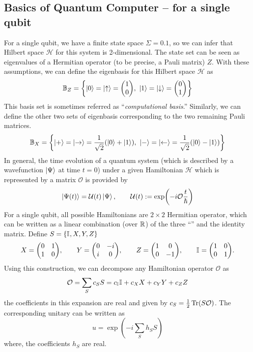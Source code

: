 \documentclass[11pt, oneside, listof=totoc]{scrbook}
\renewcommand{\H}{\mathcal{H}}
\renewcommand{\O}{\mathcal{O}}
\newcommand{\ku}{\ket{0}}
\newcommand{\kd}{\ket{1}}
\newcommand{\kr}{\ket{+}}
\newcommand{\kl}{\ket{-}}
\newcommand{\UU}{\mathcal{U}}
\begin{document}
\subsection{Basics of Quantum Computer -- for a single qubit}\label{ssec:quantum-computer}
For a single qubit, we have a finite state space \(\Sigma = \qty{0, 1}\), so we can infer that Hilbert space \(\H\) for this system is 2-dimensional. The state set can be seen as eigenvalues of a Hermitian operator (to be precise, a Pauli matrix) \(Z\). With these assumptions, we can define the eigenbasis for this Hilbert space \(\H\) as
\begin{equation}
    \B_Z = \qty{\ku = \ket{\uparrow} = \mqty(1 \\ 0),~ \kd= \ket{\downarrow} = \mqty(0 \\ 1)}
\end{equation}
This basis set is sometimes referred as ``\emph{computational basis}.'' Similarly, we can define the other two sets of eigenbasis corresponding to the two remaining Pauli matrices.
\begin{equation}
    \B_X = \qty{\kr = \ket{\rightarrow} = \frac{1}{\sqrt{2}} \qty(\ku + \kd),~ \kl = \ket{\leftarrow} = \frac{1}{\sqrt{2}} \qty(\ku - \kd)}
\end{equation}
In general, the time evolution of a quantum system (which is described by a wavefunction \(\ket{\Psi}\) at time \(t = 0\)) under a given Hamiltonian \(\mathscr{H}\) which is represented by a matrix \(\O\) is provided by
\[
    \ket{\Psi (t)} = \UU(t) \ket{\Psi}, \qquad \UU(t) := \exp(- i \O \frac{t}{\hslash})
\]
For a single qubit, all possible Hamiltonians are \(2 \times 2\) Hermitian operator, which can be written as a linear combination (over \(\mathbb R\)) of the three ``'' and the identity matrix. Define \(S = \qty{\mathbb{I}_{}, X, Y, Z}\)
\begin{equation}
    X = \mqty(0 & 1 \\ 1 & 0), \qquad Y = \mqty(0 & -i \\ i & 0), \qquad Z = \mqty(1 & 0 \\ 0 & -1), \qquad \I{} = \mqty(1 & 0 \\ 0 & 1).
\end{equation}
Using this construction, we can decompose any Hamiltonian operator \(\O\) as
\[
    \O = \sum_{S} c_S S = c_{\I{}} \I{} + c_X X + c_Y Y + c_Z Z
\]
the coefficients in this expansion are real and given by \(c_S = \half \Tr(S \O)\). The corresponding unitary can be written as
\[
    u = \exp(- i \sum_{S} h_S S)
\]
where, the coefficients \(h_S\) are real.\\
\end{document}
